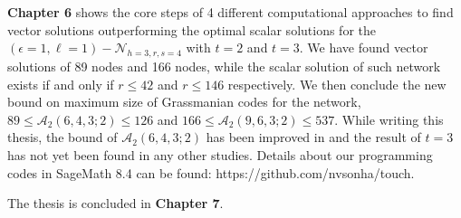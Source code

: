 \textbf{Chapter 6} shows the core steps of 4 different computational
approaches to find vector solutions outperforming the optimal scalar
solutions for the $\left(\epsilon=1,\ell=1\right)-\mathcal{N}_{h=3,r,s=4}$
with $t=2$ and $t=3$. We have found vector solutions of 89 nodes
and 166 nodes, while the scalar solution of such network exists if
and only if $r\leq42$ and $r\leq146$ respectively. We then conclude
the new bound on maximum size of Grassmanian codes for the network,
$89\leq\mathcal{A}_{2}\left(6,4,3;2\right)\leq126$ and $166\leq\mathcal{A}_{2}\left(9,6,3;2\right)\leq537$.
While writing this thesis, the bound of $\mathcal{A}_{2}\left(6,4,3;2\right)$
has been improved in \cite{Etzion:2018} and the result of $t=3$
has not yet been found in any other studies. Details about our programming codes in SageMath 8.4 can be found: https://github.com/nvsonha/touch.

The thesis is concluded in \textbf{Chapter 7}. 

\clearpage
